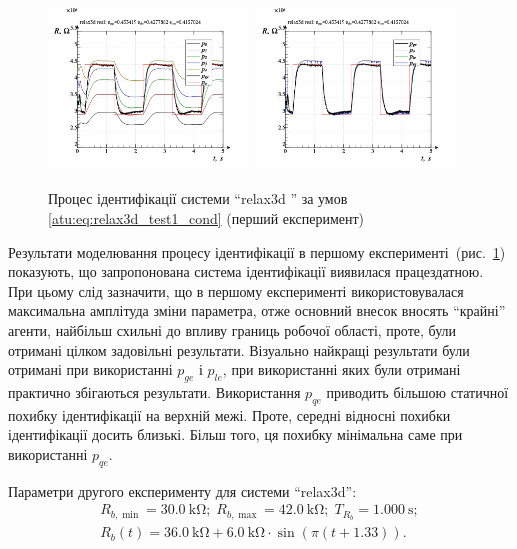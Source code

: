 \begin{figure}[htb!]
  \centerline{
    \includegraphics[width=0.48\textwidth]{p/relax3d_read_id2-p_p_00.png}
    \hfill
    \includegraphics[width=0.48\textwidth]{p/relax3d_read_id2-p_pp_00.png}
  }
  \caption{Процес ідентифікації системи ``relax3d '' за умов \ref{atu:eq:relax3d_test1_cond} (перший експеримент)}
  \label{atu:f:relax3d_id_1}
\end{figure}

Результати моделювання процесу ідентифікації в першому
експерименті~(рис.~\ref{atu:f:relax3d_id_1}) показують, що запропонована
система ідентифікації виявилася працездатною. При цьому
слід зазначити, що в першому експерименті використовувалася
максимальна амплітуда зміни параметра, отже основний внесок
вносять ``крайні'' агенти, найбільш схильні до впливу границь
робочої області, проте, були отримані цілком задовільні
результати. Візуально найкращі результати були отримані при
використанні
$p_{ge} $ і
$p_{le} $, при використанні яких були отримані практично збігаються
результати. Використання
$p_{qe} $ приводить більшою статичної похибку ідентифікації на
верхній межі. Проте, середні відносні похибки ідентифікації
досить близькі. Більш того, ця похибку мінімальна саме при
використанні $ p_{qe} $.



Параметри другого експерименту для системи ``relax3d'':
%
\begin{equation}
  \begin{array}{c}
    R_{b,\min} = \SI{30.0}{\kilo\ohm};
    \;
    R_{b,\max} = \SI{42.0}{\kilo\ohm};
    \;
    T_{R_b} = \SI{1.000}{\second};
  \\
    R_b(t) = \SI{36.0}{\kilo\ohm} + \SI{6.0}{\kilo\ohm} \cdot \sin( \pi ( t + 1.33 ) ).
  \end{array}
  \label{atu:eq:relax3d_test2_cond}
\end{equation}

